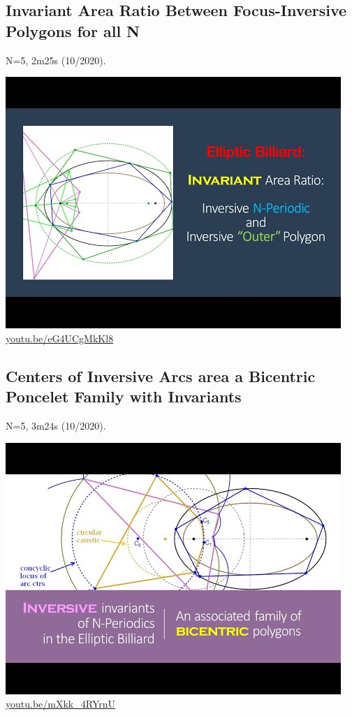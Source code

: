 \documentclass[12pt]{amsart}
\begin{document}
\subsection{Invariant Area Ratio Between Focus-Inversive Polygons for all N}
\label{vid:eG4UCgMkKl8}
\noindent N=5, 2m25s (10/2020). 
\begin{center}\includegraphics[width=.5\textwidth]{pics/eG4UCgMkKl8.jpg} \\ 
\href{https://youtu.be/eG4UCgMkKl8}{\url{youtu.be/eG4UCgMkKl8}}\end{center}
% 

\subsection{Centers of Inversive Arcs area a Bicentric Poncelet Family with Invariants}
\label{vid:mXkk_4RYrnU}
\noindent N=5, 3m24s (10/2020). 
\begin{center}\includegraphics[width=.5\textwidth]{pics/mXkk_4RYrnU.jpg} \\ 
\href{https://youtu.be/mXkk_4RYrnU}{\url{youtu.be/mXkk\_4RYrnU}}\end{center}
% 
\end{document}

